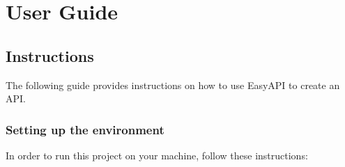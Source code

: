 \chapter{User Guide}

\section{Instructions}

The following guide provides instructions on how to use EasyAPI to create an API.

\subsection{Setting up the environment}

In order to run this project on your machine, follow these instructions:

